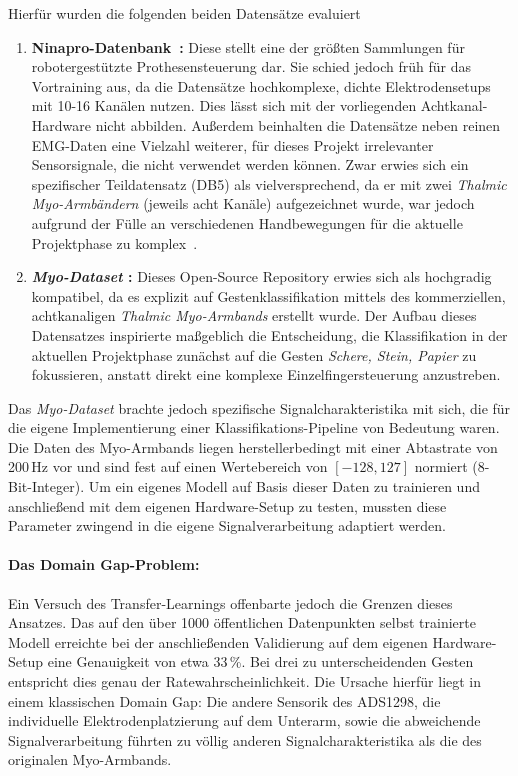     Hierfür wurden die folgenden beiden Datensätze evaluiert
    \begin{enumerate}
        \item \textbf{Ninapro-Datenbank~\cite{ninapro_website}:} Diese stellt eine der größten Sammlungen für robotergestützte Prothesensteuerung dar. Sie schied jedoch früh für das Vortraining aus, da die Datensätze hochkomplexe, dichte Elektrodensetups mit 10-16 Kanälen nutzen. Dies lässt sich mit der vorliegenden Achtkanal-Hardware nicht abbilden. Außerdem beinhalten die Datensätze neben reinen \ac{EMG}-Daten eine Vielzahl weiterer, für dieses Projekt irrelevanter Sensorsignale, die nicht verwendet werden können. Zwar erwies sich ein spezifischer Teildatensatz (DB5) als vielversprechend, da er mit zwei \textit{Thalmic Myo-Armbändern} (jeweils acht Kanäle) aufgezeichnet wurde, war jedoch aufgrund der Fülle an verschiedenen Handbewegungen für die aktuelle Projektphase zu komplex~\cite{pizzolato2017comparison}.
        \item \textbf{\textit{Myo-Dataset} \cite{myo_dataset}:} Dieses Open-Source Repository erwies sich als hochgradig kompatibel, da es explizit auf Gestenklassifikation mittels des kommerziellen, achtkanaligen \textit{Thalmic Myo-Armbands} erstellt wurde. Der Aufbau dieses Datensatzes inspirierte maßgeblich die Entscheidung, die Klassifikation in der aktuellen Projektphase zunächst auf die Gesten \textit{Schere, Stein, Papier} zu fokussieren, anstatt direkt eine komplexe Einzelfingersteuerung anzustreben.
    \end{enumerate}
    Das \textit{Myo-Dataset} brachte jedoch spezifische Signalcharakteristika mit sich, die für die eigene Implementierung einer Klassifikations-Pipeline von Bedeutung waren. Die Daten des Myo-Armbands liegen herstellerbedingt mit einer Abtastrate von 200\,Hz vor und sind fest auf einen Wertebereich von $[-128, 127]$ normiert (8-Bit-Integer). Um ein eigenes Modell auf Basis dieser Daten zu trainieren und anschließend mit dem eigenen Hardware-Setup zu testen, mussten diese Parameter zwingend in die eigene Signalverarbeitung adaptiert werden.

    \paragraph{Das Domain Gap-Problem:}
    Ein Versuch des Transfer-Learnings offenbarte jedoch die Grenzen dieses Ansatzes. Das auf den über 1000 öffentlichen Datenpunkten selbst trainierte Modell erreichte bei der anschließenden Validierung auf dem eigenen Hardware-Setup eine Genauigkeit von etwa 33\,\%. Bei drei zu unterscheidenden Gesten entspricht dies genau der Ratewahrscheinlichkeit. Die Ursache hierfür liegt in einem klassischen Domain Gap: Die andere Sensorik des \textsf{ADS1298}, die individuelle Elektrodenplatzierung auf dem Unterarm, sowie die abweichende Signalverarbeitung führten zu völlig anderen Signalcharakteristika als die des originalen Myo-Armbands.

